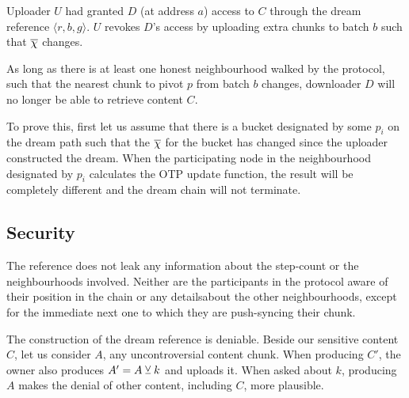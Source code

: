 Uploader $U$ had granted $D$ (at address $a$) access to $C$ through the dream reference $\langle r,b,g\rangle $. $U$ revokes $D$'s access by uploading extra chunks to batch $b$ such that $\overline{\Huge\chi}$ changes.

As long as there is at least one honest neighbourhood walked by the protocol, such that the nearest chunk to pivot $p$ from batch $b$ changes, downloader $D$ will no longer be able to retrieve content $C$.

To prove this, first let us assume that there is a bucket designated by some $p_i$ on the dream path such that the $\overline{\Huge\chi}$ for the bucket has changed since the uploader constructed the dream. When the participating node in the neighbourhood designated by $p_i$ calculates the OTP update function, the result will be completely different and the dream chain will not terminate. 






\subsection{Security}


The reference does not leak any information about the step-count or the neighbourhoods involved. Neither are the participants in the protocol aware of their position in the chain or any detailsabout the other neighbourhoods, except for the immediate next one to which they are push-syncing their chunk.

The construction of the dream reference is deniable.
Beside our sensitive content $C$, let us consider $A$, any uncontroversial content chunk. When producing $C'$, the owner also produces  $A'=A\veebar k$ and uploads it. When asked about $k$, producing $A$ makes the denial of other content, including $C$, more plausible. 

